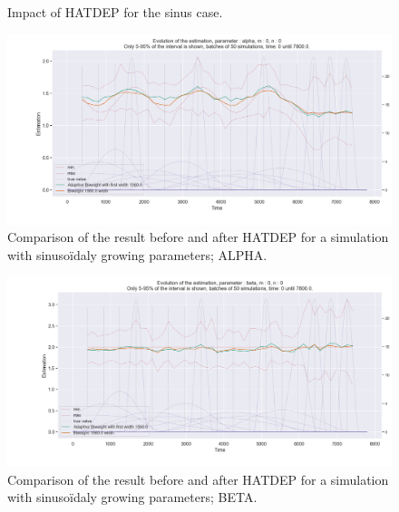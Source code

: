 \begin{figure}
\centering
{} 
\caption{Impact of HATDEP for  the sinus case.}
\label{fig:compar_kernels_4}
\end{figure}

\begin{figure}
\centering
\includegraphics[width = 0.90 \textwidth]{../imag/chap3/4/M.png}
\caption{Comparison of the result before and after HATDEP for a simulation with sinusoïdaly growing parameters; ALPHA.}
\label{fig:first_estimate_4_alpha}
\end{figure}

\begin{figure}
\centering
\includegraphics[width = 0.90 \textwidth]{../imag/chap3/4/N.png}
\caption{Comparison of the result before and after HATDEP for a simulation with sinusoïdaly growing parameters; BETA.}
\label{fig:first_estimate_4_beta}
\end{figure}

